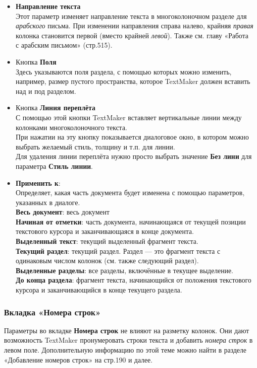 \documentclass[a4paper,10pt]{article}
\begin{document}
\begin{itemize}
 \item \textbf{Направление текста}\\
 Этот параметр изменяет направление текста в многоколоночном разделе для \textit{арабского} письма. При изменении направления справа налево, крайняя \textit{правая} колонка становится первой (вместо крайней \textit{левой}). Также см. главу «Работа с арабским письмом» (стр.515).
 \item Кнопка \textbf{Поля}\\
 Здесь указываются поля раздела, с помощью которых можно изменить, например, размер пустого пространства, которое TextMaker должен вставить над и под разделом.
 \item Кнопка \textbf{Линия переплёта}\\
 С помощью этой кнопки TextMaker вставляет вертикальные линии между колонками многоколоночного текста.\\
 При нажатии на эту кнопку показывается диалоговое окно, в котором можно выбрать желаемый стиль, толщину и т.п. для линии.\\
 Для удаления линии переплёта нужно просто выбрать значение \textbf{Без лини} для параметра \textbf{Стиль линии}.
 \item \textbf{Применить к}:\\
 Определяет, какая часть документа будет изменена с помощью параметров, указанных в диалоге.\\
 \textbf{Весь документ}: весь документ\\
 \textbf{Начиная от отметки}: часть документа, начинающаяся от текущей позиции текстового курсора и заканчивающаяся в конце документа.\\
 \textbf{Выделенный текст}: текущий выделенный фрагмент текста.\\
 \textbf{Текущий раздел}: текущий раздел. Раздел --- это фрагмент текста с одинаковым числом колонок (см. также следующий раздел).\\
 \textbf{Выделенные разделы}: все разделы, включённые в текущее выделение.\\
 \textbf{До конца раздела}: фрагмент текста, начинающийся от положения текстового курсора и заканчивающийся в конце текущего раздела.
 \end{itemize}

 \subsubsection{Вкладка «Номера строк»}
 Параметры во вкладке \textbf{Номера строк} не влияют на разметку колонок. Они дают возможность TextMaker пронумеровать строки текста и добавить \textit{номера строк} в левом поле. Дополнительную информацию по этой теме можно найти в разделе «Добавление номеров строк» на стр.190 и далее.
\end{document}
